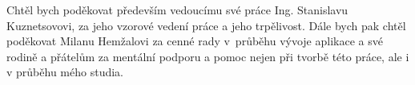 \documentclass[czech,bachelor,unicode]{ctufit-thesis}
\theoremstyle{plain}
\theoremstyle{definition}
\theoremstyle{remark}
\numberwithin{theorem}{chapter}
\begin{document}
 
\frontmatter\frontmatterinit %


\thispagestyle{empty}\cleardoublepage\maketitle %

\imprintpage %

\tableofcontents %
\listoffigures %
\begingroup
\let\clearpage\relax
\listoftables %
\lstlistoflistings %
\endgroup


\begin{acknowledgmentpage}
	Chtěl bych poděkovat především vedoucímu své práce Ing. Stanislavu Kuznetsovovi, za jeho vzorové vedení práce a jeho trpělivost. Dále bych pak chtěl poděkovat Milanu Hemžalovi za cenné rady v~průběhu vývoje aplikace a své rodině a přátelům za mentální podporu a pomoc nejen při tvorbě této práce, ale i v průběhu mého studia.
\end{acknowledgmentpage} 
\end{document}
